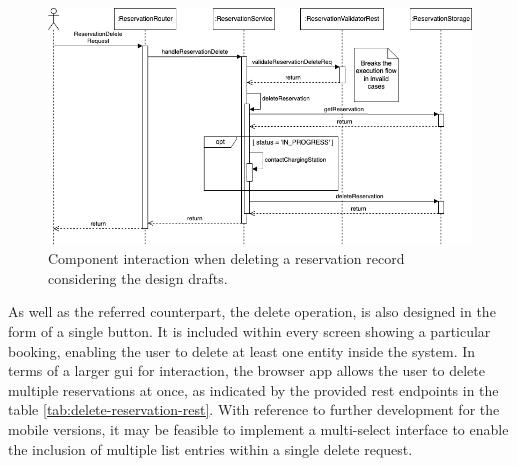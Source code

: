 \newpage

\begin{figure}[h]
    \centering
    \includegraphics[scale=0.4]{resources/images/main/6_implementation/processes/ReservationDelete.png}
    \caption{Component interaction when deleting a reservation record considering the design drafts.}
    \label{fig:delete-reservation-seqflow}
\end{figure}

\noindent As well as the referred counterpart, the delete operation, is also designed in the form of a single button. It is included within every screen showing a particular booking, enabling the user to delete at least one entity inside the system.
In terms of a larger \acrshort{gui} for interaction, the browser app allows the user to delete multiple reservations at once, as indicated by the provided \acrshort{rest} endpoints in the table \ref{tab:delete-reservation-rest}.
With reference to further development for the mobile versions, it may be feasible to implement a multi-select interface to enable the inclusion of multiple list entries within a single delete request.

